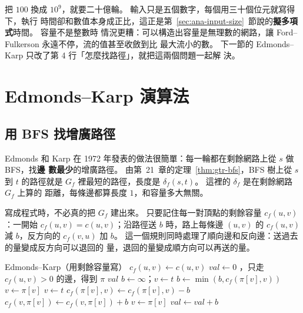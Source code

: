 把 $100$ 換成 $10^9$，就要二十億輪。 輸入只是五個數字，每個用三十個位元就寫得下，執行
時間卻和數值本身成正比，這正是第~\ref{sec:ana-input-size}~節說的\textbf{擬多項式}時間。 容量不是整數時
情況更糟：可以構造出容量是無理數的網路，讓 Ford--Fulkerson 永遠不停，流的值甚至收斂到比
最大流小的數。 下一節的 Edmonds--Karp 只改了第 4 行「怎麼找路徑」，就把這兩個問題一起解
決。

\section{Edmonds--Karp 演算法}
\label{sec:flw-ek}

\subsection{用 BFS 找增廣路徑}

Edmonds 和 Karp 在 1972 年發表的做法很簡單：每一輪都在剩餘網路上從 $s$ 做 BFS，找\textbf{邊
數最少}的增廣路徑。 由第~21~章的定理~\ref{thm:gtr-bfs}，BFS 樹上從 $s$ 到 $t$ 的路徑就是
$G_f$ 裡最短的路徑，長度是 $\delta_f(s, t)$。 這裡的 $\delta_f$ 是在剩餘網路 $G_f$ 上算的
距離，每條邊都算長度 $1$，和容量多大無關。

寫成程式時，不必真的把 $G_f$ 建出來。 只要記住每一對頂點的剩餘容量 $c_f(u, v)$：一開始
$c_f(u, v) = c(u, v)$；沿路徑送 $b$ 時，路上每條邊 $(u, v)$ 的 $c_f(u, v)$ 減 $b$，反方向的
$c_f(v, u)$ 加 $b$。 這一個規則同時處理了順向邊和反向邊：送過去的量變成反方向可以退回的
量，退回的量變成順方向可以再送的量。

\begin{pseudo}[label=alg:flw-ek]{Edmonds--Karp（用剩餘容量寫）}
        \State $c_f(u, v) \gets c(u, v)$
    \EndFor
    \State $\mathit{val} \gets 0$
    \While{\TRUE}
        \State {}，只走 $c_f(u, v) > 0$ 的邊，得到 $\pi$
            \State \Return $\mathit{val}$
        \EndIf
        \State $b \gets \infty$；$v \gets t$
         
            \State $b \gets \min(b, c_f(\pi[v], v))$
            \State $v \gets \pi[v]$
        \EndWhile
        \State $v \gets t$
         
            \State $c_f(\pi[v], v) \gets c_f(\pi[v], v) - b$
            \State $c_f(v, \pi[v]) \gets c_f(v, \pi[v]) + b$
            \State $v \gets \pi[v]$
        \EndWhile
        \State $\mathit{val} \gets \mathit{val} + b$
    \EndWhile
\EndFunction
\end{pseudo}

